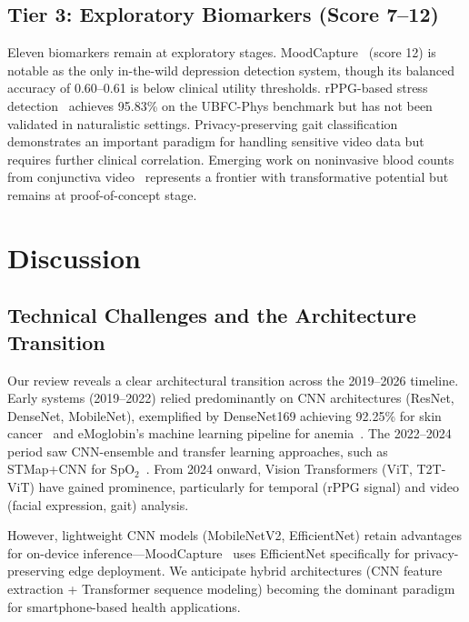 \documentclass[conference]{IEEEtran}
\begin{document}
\subsection{Tier 3: Exploratory Biomarkers (Score 7--12)}

Eleven biomarkers remain at exploratory stages. MoodCapture~\cite{nepal2024moodcapture} (score 12) is notable as the only in-the-wild depression detection system, though its balanced accuracy of 0.60--0.61 is below clinical utility thresholds. rPPG-based stress detection~\cite{fontes2024stress} achieves 95.83\% on the UBFC-Phys benchmark but has not been validated in naturalistic settings. Privacy-preserving gait classification~\cite{gaitclassification2025} demonstrates an important paradigm for handling sensitive video data but requires further clinical correlation. Emerging work on noninvasive blood counts from conjunctiva video~\cite{bulbarconjunctiva2026} represents a frontier with transformative potential but remains at proof-of-concept stage.

\section{Discussion}

\subsection{Technical Challenges and the Architecture Transition}

Our review reveals a clear architectural transition across the 2019--2026 timeline. Early systems (2019--2022) relied predominantly on CNN architectures (ResNet, DenseNet, MobileNet), exemplified by DenseNet169 achieving 92.25\% for skin cancer~\cite{naqvi2023skincancer} and eMoglobin's machine learning pipeline for anemia~\cite{zhao2024emoglobin}. The 2022--2024 period saw CNN-ensemble and transfer learning approaches, such as STMap+CNN for SpO$_2$~\cite{cheng2024contactless}. From 2024 onward, Vision Transformers (ViT, T2T-ViT) have gained prominence, particularly for temporal (rPPG signal) and video (facial expression, gait) analysis.

However, lightweight CNN models (MobileNetV2, EfficientNet) retain advantages for on-device inference---MoodCapture~\cite{nepal2024moodcapture} uses EfficientNet specifically for privacy-preserving edge deployment. We anticipate hybrid architectures (CNN feature extraction + Transformer sequence modeling) becoming the dominant paradigm for smartphone-based health applications.
\end{document}

